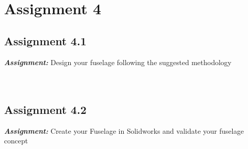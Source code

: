 \documentclass{article}
\begin{document}
\clearpage 

\section{Assignment 4\label{Assignment_4}}

\subsection{Assignment 4.1\label{Assignment_4.1}}

\textbf{\textit{Assignment:}} Design your fuselage following the suggested methodology\\ \\ \\ 





\clearpage

\subsection{Assignment 4.2\label{Assignment_4.2}}

\textbf{\textit{Assignment:}} Create your Fuselage in Solidworks 
and validate your fuselage concept



\pagebreak
\printbibliography
    
\end{document}
